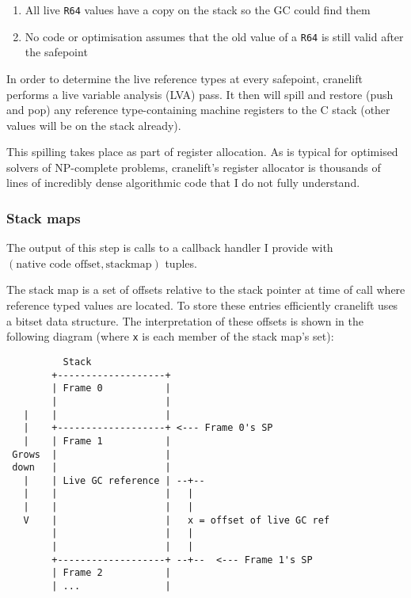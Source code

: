 \begin{enumerate}
      \item All live \texttt{R64} values have a copy on the stack so the GC could find them
      \item No code or optimisation assumes that the old value of a \texttt{R64} is still valid
            after the safepoint
\end{enumerate}

In order to determine the live reference types at every safepoint, cranelift performs a live
variable analysis (LVA) pass. It then will spill and restore (push and pop) any reference
type-containing machine registers to the C stack (other values will be on the stack already).

This spilling takes place as part of register allocation. As is typical for optimised solvers of
NP-complete problems, cranelift's register allocator is thousands of lines of incredibly dense
algorithmic code that I do not fully understand.

\subsubsection{Stack maps}

The output of this step is calls to a callback handler I provide with \((\text{native code offset},
\text{stackmap})\)
tuples.

The stack map is a set of offsets relative to the stack pointer at time of call where reference
typed values are located. To store these entries efficiently cranelift uses a bitset data
structure. The interpretation of these offsets is shown in the following diagram (where \texttt{x}
is each member of the stack map's set):

\begin{verbatim}
          Stack
        +-------------------+
        | Frame 0           |
        |                   |
   |    |                   |
   |    +-------------------+ <--- Frame 0's SP
   |    | Frame 1           |
 Grows  |                   |
 down   |                   |
   |    | Live GC reference | --+--
   |    |                   |   |
   |    |                   |   |
   V    |                   |   x = offset of live GC ref
        |                   |   |
        |                   |   |
        +-------------------+ --+--  <--- Frame 1's SP
        | Frame 2           |
        | ...               |
\end{verbatim}

